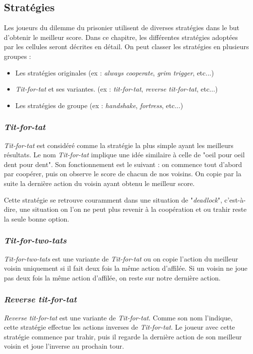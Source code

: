 \documentclass[a4paper]{article}
\begin{document}
\pagebreak
\subsection{Stratégies}
Les joueurs du dilemme du prisonier utilisent de diverses stratégies\cite{StratIPD}\cite{StratIPD2} dans le but d'obtenir le meilleur score. Dans ce chapitre, les différentes stratégies adoptées par les cellules seront décrites en détail. On peut classer les stratégies en plusieurs groupes :
\begin{itemize}
    \item Les stratégies originales (ex : \textit{always cooperate}, \textit{grim trigger}, etc...)
    \item \textit{Tit-for-tat} et ses variantes. (ex : \textit{tit-for-tat}, \textit{reverse tit-for-tat}, etc...)
    \item Les stratégies de groupe (ex : \textit{handshake}, \textit{fortress}, etc...)
\end{itemize}

\subsubsection{\textit{Tit-for-tat}}
\textit{Tit-for-tat} est considéré comme la stratégie la plus simple ayant les meilleurs résultats\cite{TFT}. Le nom \textit{Tit-for-tat} implique une idée similaire à celle de "oeil pour oeil dent pour dent". Son fonctionnement est le suivant : on commence tout d'abord par coopérer, puis on observe le score de chacun de nos voisins. On copie par la suite la dernière action du voisin ayant obtenu le meilleur score.

Cette stratégie se retrouve couramment dans une situation de "\textit{deadlock}", c'est-à-dire, une situation on l'on ne peut plus revenir à la coopération et ou trahir reste la seule bonne option.

\subsubsection{\textit{Tit-for-two-tats}}
\textit{Tit-for-two-tats} est une variante de \textit{Tit-for-tat} ou on copie l'action du meilleur voisin uniquement si il fait deux fois la même action d'affilée. Si un voisin ne joue pas deux fois la même action d'affilée, on reste sur notre dernière action.

\subsubsection{\textit{Reverse tit-for-tat}}
\textit{Reverse tit-for-tat} est une variante de \textit{Tit-for-tat}. Comme son nom l'indique, cette stratégie effectue les actions inverses de \textit{Tit-for-tat}. Le joueur avec cette stratégie commence par trahir, puis il regarde la dernière action de son meilleur voisin et joue l'inverse au prochain tour.
\end{document}
